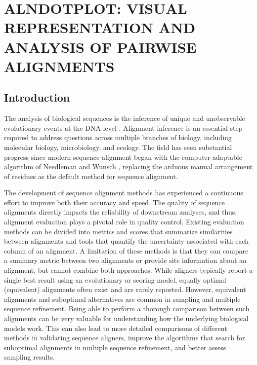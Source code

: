 \chapter{ALNDOTPLOT: VISUAL REPRESENTATION AND ANALYSIS OF PAIRWISE ALIGNMENTS}  \label{ch:alndotplot}

\section{Introduction}
The analysis of biological sequences is the inference of unique and unobservable evolutionary events at the DNA level \citep{morrison_MSA_2018}. Alignment inference is an essential step required to address questions across multiple branches of biology, including molecular biology, microbiology, and ecology. The field has seen substantial progress since modern sequence alignment began with the computer-adaptable algorithm of Needleman and Wunsch \citeyearpar{Needleman1970}, replacing the arduous manual arrangement of residues as the default method for sequence alignment.


The development of sequence alignment methods has experienced a continuous effort to improve both their accuracy and speed. The quality of sequence alignments directly impacts the reliability of downstream analyses, and thus, alignment evaluation plays a pivotal role in quality control. Existing evaluation methods can be divided into metrics and scores that summarize similarities between alignments and tools that quantify the uncertainty associated with each column of an alignment. A limitation of these methods is that they can compare a summary metric between two alignments or provide site information about an alignment, but cannot combine both approaches. While aligners typically report a single best result using an evolutionary or scoring model, equally optimal (equivalent) alignments often exist and are rarely reported. However, equivalent alignments and suboptimal alternatives are common in sampling and multiple sequence refinement. Being able to perform a thorough comparison between such alignments can be very valuable for understanding how the underlying biological models work. This can also lead to more detailed comparisons of different methods in validating sequence aligners, improve the algorithms that search for suboptimal alignments in multiple sequence refinement, and better assess sampling results.

